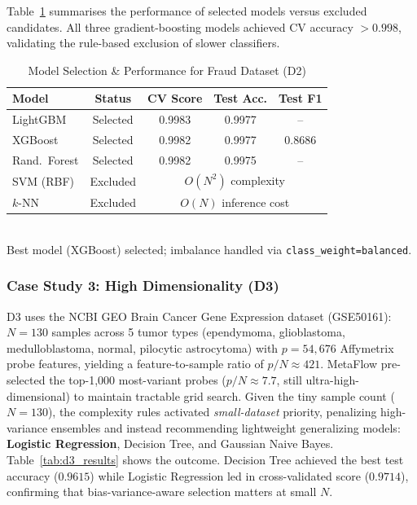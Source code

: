 \documentclass[conference]{IEEEtran}
\begin{document}
   Table~\ref{tab:d2_results} summarises the performance of selected models versus excluded candidates. All three gradient-boosting models achieved CV accuracy $>0.998$, validating the rule-based exclusion of slower classifiers.

   \begin{table}[htbp]
   \centering
   \caption{Model Selection \& Performance for Fraud Dataset (D2)}
   \label{tab:d2_results}
   \small
   \begin{tabular}{lcccc}
   \hline
   \textbf{Model} & \textbf{Status} & \textbf{CV Score} & \textbf{Test Acc.} & \textbf{Test F1} \\
   \hline
   LightGBM  & Selected & 0.9983 & 0.9977 & -- \\
   XGBoost   & Selected & 0.9982 & 0.9977 & 0.8686 \\
   Rand.\ Forest & Selected & 0.9982 & 0.9975 & -- \\
   SVM (RBF) & Excluded & \multicolumn{3}{c}{$O(N^2)$ complexity} \\
   $k$-NN    & Excluded & \multicolumn{3}{c}{$O(N)$ inference cost} \\
   \hline
   \end{tabular}
   \vspace{1mm}
   \\{\scriptsize Best model (XGBoost) selected; imbalance handled via \texttt{class\_weight=balanced}.}
   \end{table}

   \subsubsection{Case Study 3: High Dimensionality (D3)}
   D3 uses the NCBI GEO Brain Cancer Gene Expression dataset (GSE50161): $N=130$ samples across 5 tumor types (ependymoma, glioblastoma, medulloblastoma, normal, pilocytic astrocytoma) with $p=54{,}676$ Affymetrix probe features, yielding a feature-to-sample ratio of $p/N \approx 421$. MetaFlow pre-selected the top-1{,}000 most-variant probes ($p/N \approx 7.7$, still ultra-high-dimensional) to maintain tractable grid search. Given the tiny sample count ($N=130$), the complexity rules activated \textit{small-dataset} priority, penalizing high-variance ensembles and instead recommending lightweight generalizing models: \textbf{Logistic Regression}, Decision Tree, and Gaussian Naive Bayes.
   Table~\ref{tab:d3_results} shows the outcome. Decision Tree achieved the best test accuracy ($0.9615$) while Logistic Regression led in cross-validated score ($0.9714$), confirming that bias-variance-aware selection matters at small $N$.
\end{document}

